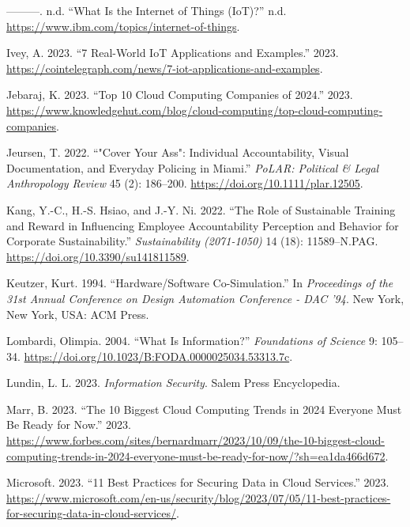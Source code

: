 \documentclass[
  letterpaper,
  DIV=11,
  numbers=noendperiod]{scrreprt}
\newlength{\cslhangindent}
\newenvironment{CSLReferences}[2] %
 {\begin{list}{}{%
  \setlength{\itemindent}{0pt}
  \setlength{\leftmargin}{0pt}
  \setlength{\parsep}{0pt}
  \ifodd #1
   \setlength{\leftmargin}{\cslhangindent}
   \setlength{\itemindent}{-1\cslhangindent}
  \fi
  \setlength{\itemsep}{#2\baselineskip}}}
 {\end{list}}
\begin{document}
\begin{CSLReferences}{1}{0}
---------. n.d. {``What Is the Internet of Things (IoT)?''} n.d.
\url{https://www.ibm.com/topics/internet-of-things}.

Ivey, A. 2023. {``7 Real-World IoT Applications and Examples.''} 2023.
\url{https://cointelegraph.com/news/7-iot-applications-and-examples}.

Jebaraj, K. 2023. {``Top 10 Cloud Computing Companies of 2024.''} 2023.
\url{https://www.knowledgehut.com/blog/cloud-computing/top-cloud-computing-companies}.

Jeursen, T. 2022. {``"Cover Your Ass": Individual Accountability, Visual
Documentation, and Everyday Policing in Miami.''} \emph{PoLAR: Political
\& Legal Anthropology Review} 45 (2): 186--200.
\url{https://doi.org/10.1111/plar.12505}.

Kang, Y.-C., H.-S. Hsiao, and J.-Y. Ni. 2022. {``The Role of Sustainable
Training and Reward in Influencing Employee Accountability Perception
and Behavior for Corporate Sustainability.''} \emph{Sustainability
(2071-1050)} 14 (18): 11589--N.PAG.
\url{https://doi.org/10.3390/su141811589}.

Keutzer, Kurt. 1994. {``Hardware/Software Co-Simulation.''} In
\emph{Proceedings of the 31st Annual Conference on Design Automation
Conference - {DAC} '94}. New York, New York, USA: ACM Press.

Lombardi, Olimpia. 2004. {``What Is Information?''} \emph{Foundations of
Science} 9: 105--34.
\url{https://doi.org/10.1023/B:FODA.0000025034.53313.7c}.

Lundin, L. L. 2023. \emph{Information Security}. Salem Press
Encyclopedia.

Marr, B. 2023. {``The 10 Biggest Cloud Computing Trends in 2024 Everyone
Must Be Ready for Now.''} 2023.
\url{https://www.forbes.com/sites/bernardmarr/2023/10/09/the-10-biggest-cloud-computing-trends-in-2024-everyone-must-be-ready-for-now/?sh=ea1da466d672}.

Microsoft. 2023. {``11 Best Practices for Securing Data in Cloud
Services.''} 2023.
\url{https://www.microsoft.com/en-us/security/blog/2023/07/05/11-best-practices-for-securing-data-in-cloud-services/}.


\end{CSLReferences}
\end{document}
